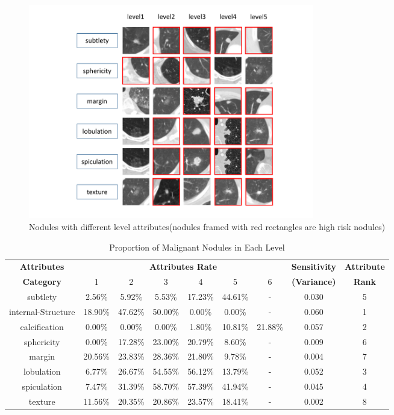 \documentclass[runningheads]{llncs}
\begin{document}
\begin{figure}[htb]
\centerline{\includegraphics[width=125mm]{nodules.pdf}}
\vspace{-0.5cm}
\caption{Nodules with different level attributes(nodules framed with red rectangles are high risk nodules)}
\vspace{-0.5cm}
\label{nodules}
\end{figure}

\begin{table}[htb]
\caption{Proportion of Malignant Nodules in Each Level}
\vspace{-0.5cm}
\begin{center}
\begin{tabular}{|c|c|c|c|c|c|c|c|c|}
\hline
\textbf{Attributes}&\multicolumn{6}{|c|}{\textbf{Attributes Rate}} & \textbf{Sensitivity}&\textbf{Attribute}\\
\cline{2-7}
\textbf{Category}& 1&2&3&4&5&6& \textbf{(Variance)}&\textbf{Rank} \\
\hline
subtlety& 2.56\% &5.92\% & 5.53\% & 17.23\% & 44.61\% & - & 0.030&5\\
internal-Structure& 18.90\% & 47.62\% & 50.00\% & 0.00\% & 0.00\% & - &0.060&1\\
calcification& 0.00\% &0.00\% & 0.00\% & 1.80\% & 10.81\% & 21.88\% & 0.057&2 \\
sphericity& 0.00\% & 17.28\% & 23.00\% & 20.79\% & 8.60\% & - &0.009&6\\
margin& 20.56\% & 23.83\% & 28.36\% & 21.80\% & 9.78\% & - &0.004&7\\
lobulation& 6.77\% & 26.67\% & 54.55\% & 56.12\% & 13.79\% & - &0.052&3\\
spiculation& 7.47\% & 31.39\% & 58.70\% & 57.39\% & 41.94\% & -&0.045& 4\\
texture& 11.56\% & 20.35\% & 20.86\% & 23.57\% & 18.41\% & - &0.002&8\\
\hline

\end{tabular}

\label{tab2}
\end{center}
\vspace{-0.5cm}
\end{table}
\end{document}
